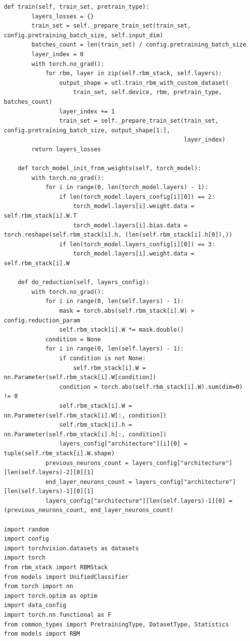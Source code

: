 \begin{lstlisting}[style=PythonStyle]
    def train(self, train_set, pretrain_type):
        layers_losses = {}
        train_set = self._prepare_train_set(train_set, config.pretraining_batch_size, self.input_dim)
        batches_count = len(train_set) / config.pretraining_batch_size
        layer_index = 0
        with torch.no_grad():
            for rbm, layer in zip(self.rbm_stack, self.layers):
                output_shape = utl.train_rbm_with_custom_dataset(
                    train_set, self.device, rbm, pretrain_type, batches_count)
                layer_index += 1
                train_set = self._prepare_train_set(train_set, config.pretraining_batch_size, output_shape[1:],
                                                    layer_index)
        return layers_losses

    def torch_model_init_from_weights(self, torch_model):
        with torch.no_grad():
            for i in range(0, len(torch_model.layers) - 1):
                if len(torch_model.layers_config[i][0]) == 2:
                    torch_model.layers[i].weight.data = self.rbm_stack[i].W.T
                    torch_model.layers[i].bias.data = torch.reshape(self.rbm_stack[i].h, (len(self.rbm_stack[i].h[0]),))
                if len(torch_model.layers_config[i][0]) == 3:
                    torch_model.layers[i].weight.data = self.rbm_stack[i].W

    def do_reduction(self, layers_config):
        with torch.no_grad():
            for i in range(0, len(self.layers) - 1):
                mask = torch.abs(self.rbm_stack[i].W) > config.reduction_param
                self.rbm_stack[i].W *= mask.double()
            condition = None
            for i in range(0, len(self.layers) - 1):
                if condition is not None:
                    self.rbm_stack[i].W = nn.Parameter(self.rbm_stack[i].W[condition])
                condition = torch.abs(self.rbm_stack[i].W).sum(dim=0) != 0
                self.rbm_stack[i].W = nn.Parameter(self.rbm_stack[i].W[:, condition])
                self.rbm_stack[i].h = nn.Parameter(self.rbm_stack[i].h[:, condition])
                layers_config["architecture"][i][0] = tuple(self.rbm_stack[i].W.shape)
            previous_neurons_count = layers_config["architecture"][len(self.layers)-2][0][1]
            end_layer_neurons_count = layers_config["architecture"][len(self.layers)-1][0][1]
            layers_config["architecture"][len(self.layers)-1][0] = (previous_neurons_count, end_layer_neurons_count)
            
import random
import config
import torchvision.datasets as datasets
import torch
from rbm_stack import RBMStack
from models import UnifiedClassifier
from torch import nn
import torch.optim as optim
import data_config
import torch.nn.functional as F
from common_types import PretrainingType, DatasetType, Statistics
from models import RBM


\end{lstlisting}
